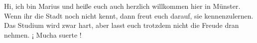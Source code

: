 \begin{multicols*}{2}
{Hi, ich bin Marius und heiße euch auch herzlich willkommen hier in Münster. Wenn ihr die Stadt noch nicht kennt, dann freut euch darauf, sie kennenzulernen. Das Studium wird zwar hart, aber lasst euch trotzdem nicht die Freude dran nehmen. ¡ Mucha suerte !}



\end{multicols*}
